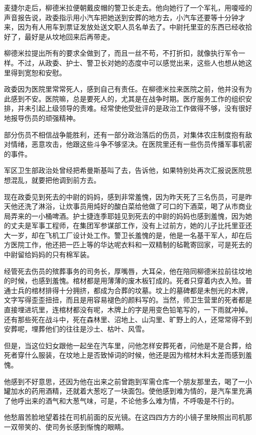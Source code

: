麦捷尔走后，柳德米拉便朝戴皮帽的警卫长走去。他向她行了一个军礼，用嗄哑的声音报告说，政委指示用小汽车把她送到安葬的地方去，小汽车还要等十分钟才来，因为有人用车到票证发放处送文职人员名单去了。中尉托里亚的东西已经收拾好了，最好是从坟地回来后再带走。

柳德米拉提出所有的要求全做到了，而且一丝不苟，不打折扣，就像执行军令一样。不过，从政委、护士、警卫长对她的态度中可以感觉出来，这些人也想从她这里得到宽恕和安慰。

政委因为医院里常常死人，感到自己有责任。在柳德米拉来医院之前，他并没有为此感到不安。医院嘛，总是要死人的，尤其是在战争时期。医疗服务工作的组织安排，并未引起上级领导的责难。经常使他受批评的是政治工作做得不够，没有很好地报导伤员的顽强精神。

部分伤员不相信战争能胜利，还有一部分政治落后的伤员，对集体农庄制度抱有敌对情绪，恶意攻击，他跟这些斗争不够坚决。在医院里还有一些伤员传播军事机密的事件。

军区卫生部政治处曾经把希曼斯基叫了去，告诉他，如果特别处再次汇报说医院思想混乱，就要把他调到前方去。

现在政委见到死去的中尉的妈妈，感到非常羞愧，因为昨天死了三名伤员，可是昨天他还洗了淋浴，让炊事员用炖好的酸白菜给他做了可口的下酒菜，喝了从市商业局弄来的一小桶啤酒。护士捷连季耶娃见到死去的中尉的妈妈也感到羞愧，因为她的丈夫是军事工程师，在集团军参谋部工作，没有上过前方，她的儿子比托里亚还大一岁，却在飞机工厂设计处工作。警卫长羞愧的是，他是一名基干军人，却在后方医院工作，他还把一匹上等的华达呢衣料和一双精制的毡靴寄回家，可是死去的中尉留给妈妈的只有棉军装。

经管死去伤员的殡葬事务的司务长，厚嘴唇，大耳朵，他在陪同柳德米拉前往坟地的时候，也感到羞愧。棺材都是用薄薄的废木板钉成的。死者只穿着内衣入殓。普通士兵的棺材排得十分拥挤，都成为合葬的坟墓。坟上的墓碑都是未刨光的木牌，文字写得歪歪扭扭，而且是用容易褪色的颜料写的。当然，师卫生营里的死者都是直接埋进坑里，连棺材都没有呢，木牌上的字是用变色铅笔写的，一下雨就冲掉。还有那些死在战斗中，死在森林里、沼地上、山沟里、旷野上的人，还常常得不到安葬呢，埋葬他们的往往是沙土、枯叶、风雪。

但是，当这位妇女跟他一起坐在汽车里，问他怎样安葬死者，问他是不是合葬，给死者穿什么服装，在坟地上是否致悼词的时候，他还是因为棺材木料太差而感到羞愧。

他感到不好意思，还因为他在出来之前曾跑到军需仓库一个朋友那里去，喝了一小罐加水的药用酒精，还就着大葱吃了一块面包。使他感到难为情的，是汽车里充满了他呼出来的酒气和大葱气味，可是，不论他多么难为情，不呼吸是不行的。

他愁眉苦脸地望着挂在司机前面的反光镜。在这四四方方的小镜子里映照出司机那一双带笑的、使司务长感到惭愧的眼睛。

